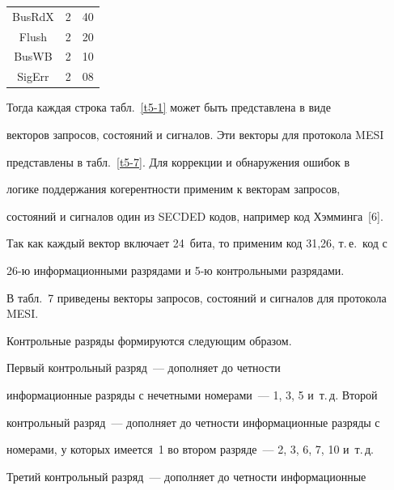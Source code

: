 \begin{table}[b]
\begin{center}
\begin{tabular}{|c|c|c|}
BusRdX&2&40\\


Flush&2&20\\


BusWB&2&10\\


SigErr&2&08\\


\hline


\end{tabular}


\end{center}


\end{table}








      Тогда каждая строка табл.~\ref{t5-1} может быть представлена в виде 


векторов запросов, состояний и сигналов. Эти векторы для протокола MESI 


представлены в табл.~\ref{t5-7}. Для коррекции и обнаружения ошибок в 


логике поддержания когерентности применим к векторам запросов, 


состояний и сигналов один из SECDED кодов, например код Хэмминга~[6]. 


Так как каждый вектор включает 24~бита, то применим код 31,26, т.\,е.\ код с 


26-ю информационными разрядами и 5-ю контрольными разрядами.





В табл.~7 приведены векторы запросов, состояний и сигналов для протокола MESI.


      


      Контрольные разряды формируются следующим образом. 


      


      Первый контрольный разряд~--- дополняет до четности 


информационные разряды с нечетными номерами~---  1, 3, 5 и~т.\,д. Второй 


контрольный разряд~--- дополняет до четности информационные разряды с 


номерами, у которых имеется~1 во втором разряде~--- 2, 3, 6, 7, 10 и~т.\,д. 


Третий  контрольный разряд~--- дополняет до четности информационные 



